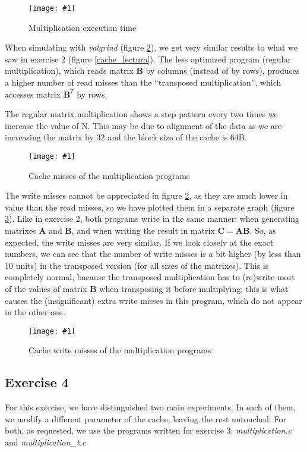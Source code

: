 \documentclass{article}
\newcommand{\myFigure}[4]{%
    \begin{figure}[!ht]
        \texttt{[image: \#1]}
        \centering
        \caption{#2}
        \label{#3}
    \end{figure}
}
\begin{document}
\myFigure{../material_P3/out3/mv_att2/mult_time.png}{Multiplication execution time}{mult_time}{0.65}

When simulating with \emph{valgrind} (figure \ref{mult_misses}), we get very similar results to what we saw in exercise 2 (figure \ref{cache_lectura}). The less optimized program (regular multiplication), which reads matrix $\mathbf{B}$ by columns (instead of by rows), produces a higher number of read misses than the ``transposed multiplication'', which accesses matrix $\mathbf{B}^T$ by rows.

The regular matrix multiplication shows a step pattern every two times we increase the value of N. This may be due to alignment of the data as we are increasing the matrix by 32 and the block size of the cache is 64B. 

\myFigure{../material_P3/out3/mv_att2/mult_cache.png}{Cache misses of the multiplication programs}{mult_misses}{0.6}

The write misses cannot be appreciated in figure \ref{mult_misses}, as they are much lower in value than the read misses, so we have plotted them in a separate graph (figure \ref{mult_misses_write}). Like in exercise 2, both programs write in the same manner: when generating matrixes $\mathbf{A}$ and $\mathbf{B}$, and when writing the result in matrix $\mathbf{C}=\mathbf{AB}$. So, as expected, the write misses are very similar. If we look closely at the exact numbers, we can see that the number of write misses is a bit higher (by less than $10$ units) in the transposed version (for all sizes of the matrixes). This is completely normal, bacause the transposed multiplication has to (re)write most of the values of matrix $\mathbf{B}$ when transposing it before multiplying; this is what causes the (insignificant) extra write misses in this program, which do not appear in the other one. 

\myFigure{../material_P3/out3/mv_att2/mult_cache_write.png}{Cache write misses of the multiplication programs}{mult_misses_write}{0.4}


\subsection*{Exercise 4}

For this exercise, we have distinguished two main experiments. In each of them, we modify a different parameter of the cache, leaving the rest untouched. For both, as requested, we use the programs written for exercise 3: \emph{multiplication.c} and \emph{multiplication\_t.c}
\end{document}
